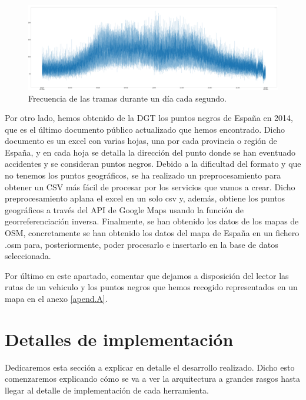 \begin{figure}[htp]
\centering
\includegraphics[scale=0.26]{Imagenes/graf3.png}
\caption{ Frecuencia de las tramas durante un día cada segundo.}
\label{graf1sec}
\end{figure}


Por otro lado, hemos obtenido de la DGT los puntos negros de España en 2014, que es el último documento público actualizado que hemos encontrado. Dicho documento es un excel con varias hojas, una por cada provincia o región de España, y en cada hoja se detalla la dirección del punto donde se han eventuado accidentes y se consideran puntos negros. Debido a la dificultad del formato y que no tenemos los puntos geográficos, se ha realizado un preprocesamiento para obtener un CSV más fácil de procesar por los servicios que vamos a crear. Dicho preprocesamiento aplana el excel en un solo csv y, además, obtiene los puntos geográficos a través del API de Google Maps usando la función de georreferenciación inversa.
Finalmente, se han obtenido los datos de los mapas de OSM, concretamente se han obtenido los datos del mapa de España en un fichero .osm para, posteriormente, poder procesarlo e insertarlo en la base de datos seleccionada.

Por último en este apartado, comentar que dejamos a disposición del lector las rutas de un vehiculo y los puntos negros que hemos recogido representados en un mapa en el anexo \ref{apend.A}. %

\section{Detalles de implementación\label{implementacion}}

Dedicaremos esta sección a explicar en detalle el desarrollo realizado. Dicho esto comenzaremos explicando cómo se va a ver la arquitectura a grandes rasgos hasta llegar al detalle de implementación de cada herramienta.

